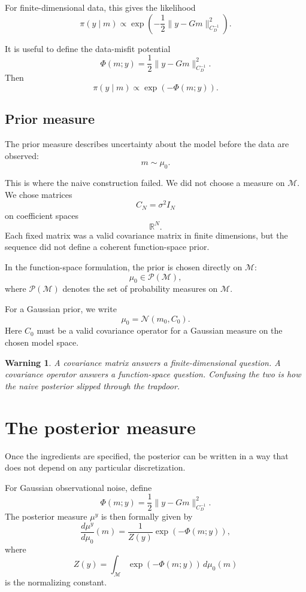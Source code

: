 \documentclass[11pt,a4paper]{book}
\newtheorem{warning}[definition]{Warning}
\newcommand{\M}{\mathcal{M}}      %
\newcommand{\prior}{\mu_0}
\newcommand{\post}{\mu^y}
\newcommand{\obs}{y}
\newcommand{\G}{G}
\begin{document}
For finite-dimensional data, this gives the likelihood
\[
    \pi(\obs\mid m)
    \propto
    \exp
    \left(
        -
        \frac{1}{2}
        \|\obs-\G m\|_{C_D^{-1}}^2
    \right).
\]

It is useful to define the data-misfit potential
\[
    \Phi(m;\obs)
    =
    \frac{1}{2}
    \|\obs-\G m\|_{C_D^{-1}}^2.
\]
Then
\[
    \pi(\obs\mid m)
    \propto
    \exp(-\Phi(m;\obs)).
\]

\subsection{Prior measure}

The prior measure describes uncertainty about the model before the data are
observed:
\[
    m \sim \prior.
\]

This is where the naive construction failed. We did not choose a measure on
$\M$. We chose matrices
\[
    C_N=\sigma^2 I_N
\]
on coefficient spaces
\[
    \mathbb{R}^N.
\]
Each fixed matrix was a valid covariance matrix in finite dimensions, but the
sequence did not define a coherent function-space prior.

In the function-space formulation, the prior is chosen directly on $\M$:
\[
    \prior \in \mathcal{P}(\M),
\]
where $\mathcal{P}(\M)$ denotes the set of probability measures on $\M$.

For a Gaussian prior, we write
\[
    \prior = \mathcal{N}(m_0,C_0).
\]
Here $C_0$ must be a valid covariance operator for a Gaussian measure on the
chosen model space.

\begin{warning}
A covariance matrix answers a finite-dimensional question.
A covariance operator answers a function-space question.
Confusing the two is how the naive posterior slipped through the trapdoor.
\end{warning}

\section{The posterior measure}

Once the ingredients are specified, the posterior can be written in a way that
does not depend on any particular discretization.

For Gaussian observational noise, define
\[
    \Phi(m;\obs)
    =
    \frac{1}{2}
    \|\obs-\G m\|_{C_D^{-1}}^2.
\]
The posterior measure $\post$ is then formally given by
\[
    \frac{d\post}{d\prior}(m)
    =
    \frac{1}{Z(\obs)}
    \exp(-\Phi(m;\obs)),
\]
where
\[
    Z(\obs)
    =
    \int_{\M}
    \exp(-\Phi(m;\obs))
    \,d\prior(m)
\]
is the normalizing constant.
\end{document}
